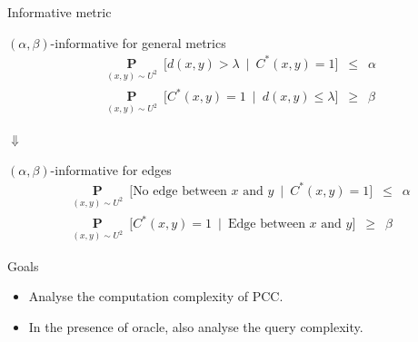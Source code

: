 \documentclass{beamer}
\newcommand{\mb}{\mathbf}
\begin{document}
\begin{frame}{Informative metric}
	\begin{block}{$(\alpha, \beta)$-informative for general metrics}		
		\vspace{-10pt}\begin{align*}
			&\underset{(x, y) \sim U^2}{\mb P}\enspace \big[ d(x, y) > \lambda \enspace|\enspace C^*(x, y) = 1\big] \enspace \le \enspace \alpha \\
			&\underset{(x, y) \sim U^2}{\mb P}\enspace \big[C^*(x, y) = 1 \enspace|\enspace d(x, y) \le \lambda \big] \enspace \ge \enspace \beta 
		\end{align*}
	\end{block}	
	
	\begin{center}$\Downarrow$\end{center}
	
	\begin{block}{$(\alpha, \beta)$-informative for edges}		
		\vspace{-10pt}\begin{align*}
			&\underset{(x, y) \sim U^2}{\mb P}\enspace \big[ \text{No edge between $x$ and $y$} \enspace|\enspace C^*(x, y) = 1\big] \enspace \le \enspace \alpha \\
			&\underset{(x, y) \sim U^2}{\mb P}\enspace \big[C^*(x, y) = 1 \enspace|\enspace \text{Edge between $x$ and $y$}  \big] \enspace \ge \enspace \beta 
		\end{align*}
	\end{block}	

\end{frame}

\begin{frame}{Goals}

	\begin{itemize}
		\item Analyse the computation complexity of PCC.
		\vspace{30pt}\item In the presence of oracle, also analyse the query complexity.
	\end{itemize}	 
\end{frame}
\end{document}
